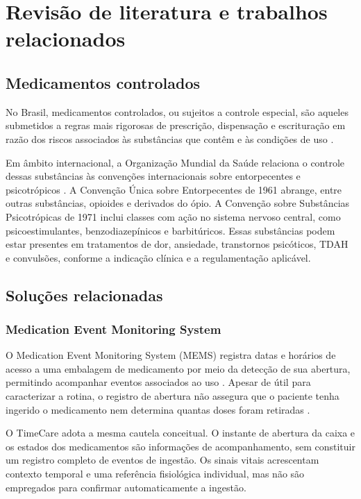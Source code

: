 \documentclass[12pt]{article}
\begin{document}
\section{Revisão de literatura e trabalhos relacionados}

\subsection{Medicamentos controlados}

No Brasil, medicamentos controlados, ou sujeitos a controle especial, são aqueles submetidos a regras mais rigorosas de prescrição, dispensação e escrituração em razão dos riscos associados às substâncias que contêm e às condições de uso \cite{anvisa_controlados}.

Em âmbito internacional, a Organização Mundial da Saúde relaciona o controle dessas substâncias às convenções internacionais sobre entorpecentes e psicotrópicos \cite{who_controlled_medicines}. A Convenção Única sobre Entorpecentes de 1961 abrange, entre outras substâncias, opioides e derivados do ópio. A Convenção sobre Substâncias Psicotrópicas de 1971 inclui classes com ação no sistema nervoso central, como psicoestimulantes, benzodiazepínicos e barbitúricos. Essas substâncias podem estar presentes em tratamentos de dor, ansiedade, transtornos psicóticos, TDAH e convulsões, conforme a indicação clínica e a regulamentação aplicável.

\subsection{Soluções relacionadas}

\subsubsection{Medication Event Monitoring System}

O Medication Event Monitoring System (MEMS) registra datas e horários de acesso a uma embalagem de medicamento por meio da detecção de sua abertura, permitindo acompanhar eventos associados ao uso \cite{pal2021review}. Apesar de útil para caracterizar a rotina, o registro de abertura não assegura que o paciente tenha ingerido o medicamento nem determina quantas doses foram retiradas \cite{mason2024technologies}.

O TimeCare adota a mesma cautela conceitual. O instante de abertura da caixa e os estados dos medicamentos são informações de acompanhamento, sem constituir um registro completo de eventos de ingestão. Os sinais vitais acrescentam contexto temporal e uma referência fisiológica individual, mas não são empregados para confirmar automaticamente a ingestão.
\end{document}
